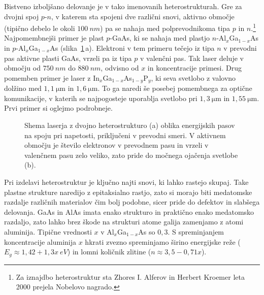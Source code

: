 Bistveno izboljšano delovanje je v tako imenovanih heterostrukturah. Gre za dvojni spoj $p$-$n$, 
v katerem sta spojeni dve različni snovi, aktivno območje (tipično debelo le okoli $100~\si{nm}$) 
pa se nahaja med polprevodnikoma tipa $p$ in $n$.\footnote{Za 
iznajdbo heterostruktur sta Zhores I. Alferov in Herbert Kroemer leta 2000 prejela Nobelovo nagrado.}
Najpomembnejši primer je plast $p$-GaAs, ki se nahaja med plastjo  
$n$-Al$_x$Ga$_{1-x}$As in $p$-Al$_x$Ga$_{1-x}$As 
(slika~\ref{fig:hetero}\,a). Elektroni v tem primeru tečejo iz tipa $n$ v prevodni pas aktivne plasti
GaAs, vrzeli pa iz tipa $p$ v valenčni pas. 
Tak laser deluje v območju od $750~\si{nm}$ do $880~\si{nm}$, odvisno od $x$ in koncentracije primesi.
Drug pomemben primer je laser z In$_{x}$Ga$_{1-x}$As$_{1-y}$P$_y$, ki seva svetlobo z valovno 
dolžino med $1,1~\si{\micro\metre}$ in $1,6~\si{\micro\metre}$. To ga naredi še posebej pomembnega za optične
komunikacije, v katerih se najpogosteje uporablja svetlobo pri $1,3~\si{\micro\meter}$ in $1,55~\si{\micro\meter}$. 
Prvi primer si oglejmo podrobneje.
\begin{figure}[h]
\centering
\def\svgwidth{145truemm} 

\caption{Shema laserja z dvojno heterostrukturo (a) oblika energijskih pasov 
na spoju pri napetosti, priključeni v prevodni smeri. V aktivnem območju
je število elektronov v prevodnem pasu in vrzeli v valenčnem pasu zelo veliko, zato pride do 
močnega ojačenja svetlobe (b).
}
\label{fig:hetero}
\end{figure}
\begin{remark}
Pri izdelavi heterostruktur je ključno najti snovi, ki lahko rastejo skupaj.
Take plastne strukture naredijo z epitaksialno rastjo, zato si morajo biti medatomske
razdalje različnih materialov čim bolj podobne, sicer pride do defektov in slabšega delovanja. 
GaAs in AlAs imata enako strukturo in praktično enako medatomsko razdaljo, zato 
lahko brez škode na strukturi atome galija zamenjamo z atomi aluminija. Tipične 
vrednosti $x$ v Al$_x$Ga$_{1-x}$As so $0,3$. S spreminjanjem koncentracije aluminija $x$ hkrati
zvezno spreminjamo širino energijske reže ($E_g \approx 1,42 + 1,3x~\si{eV}$) in lomni količnik 
zlitine ($n \approx 3,5-0,71x$).
\end{remark}

